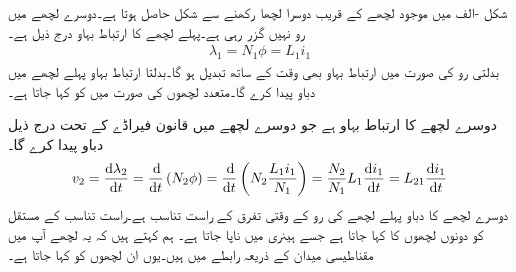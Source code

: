 شکل -الف میں موجود لچھے کے قریب دوسرا لچھا رکھنے سے شکل  حاصل ہوتا ہے۔دوسرے لچھے میں رو نہیں گزر رہی ہے۔پہلے لچھے  کا ارتباط بہاو درج ذیل ہے۔
\begin{align}
\lambda_1=N_1 \phi=L_1 i_1
\end{align}
بدلتی رو کی صورت میں ارتباط بہاو بھی وقت کے ساتھ تبدیل ہو گا۔بدلتا ارتباط بہاو پہلے لچھے میں دباو  پیدا کرے گا۔متعدد لچھوں کی صورت میں  کو  کہا جاتا ہے۔

 دوسرے لچھے کا ارتباط بہاو  ہے جو دوسرے لچھے میں قانون فیراڈے کے تحت درج ذیل دباو پیدا کرے گا۔
\begin{align}
v_2=\frac{\dif \lambda_2}{\dif t}=\frac{\dif}{\dif t}\left(N_2 \phi\right)=\frac{\dif}{\dif t}\left(N_2 \frac{L_1 i_1}{N_1}\right)=\frac{N_2}{N_1} L_1 \frac{\dif i_1}{\dif t}=L_{21}\frac{\dif i_1}{\dif t}
\end{align}
دوسرے لچھے کا دباو پہلے لچھے کی رو کے وقتی تفرق کے راست تناسب ہے۔راست تناسب کے مستقل  کو دونوں لچھوں کا  کہا جاتا ہے جسے ہینری  میں ناپا جاتا ہے۔ ہم کہتے ہیں کہ یہ لچھے آپ میں مقناطیسی میدان کے ذریعہ رابطے میں ہیں۔یوں ان لچھوں کو  کہا جاتا ہے۔
